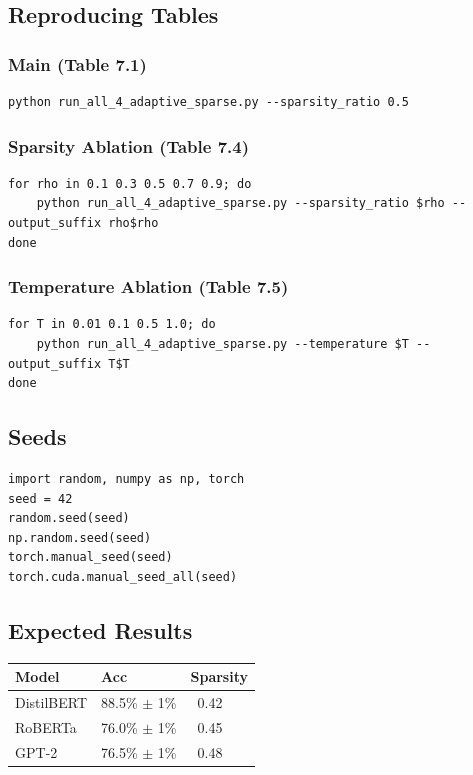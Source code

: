 \subsection{Reproducing Tables}

\subsubsection{Main (Table 7.1)}
\begin{lstlisting}
python run_all_4_adaptive_sparse.py --sparsity_ratio 0.5
\end{lstlisting}

\subsubsection{Sparsity Ablation (Table 7.4)}
\begin{lstlisting}
for rho in 0.1 0.3 0.5 0.7 0.9; do
    python run_all_4_adaptive_sparse.py --sparsity_ratio $rho --output_suffix rho$rho
done
\end{lstlisting}

\subsubsection{Temperature Ablation (Table 7.5)}
\begin{lstlisting}
for T in 0.01 0.1 0.5 1.0; do
    python run_all_4_adaptive_sparse.py --temperature $T --output_suffix T$T
done
\end{lstlisting}

\subsection{Seeds}

\begin{lstlisting}
import random, numpy as np, torch
seed = 42
random.seed(seed)
np.random.seed(seed)
torch.manual_seed(seed)
torch.cuda.manual_seed_all(seed)
\end{lstlisting}

\subsection{Expected Results}

\begin{table}[H]
\centering
\small
\begin{tabular}{lll}
\toprule
\textbf{Model} & \textbf{Acc} & \textbf{Sparsity} \\
\midrule
DistilBERT & 88.5\% $\pm$ 1\% & ~0.42 \\
RoBERTa & 76.0\% $\pm$ 1\% & ~0.45 \\
GPT-2 & 76.5\% $\pm$ 1\% & ~0.48 \\
\bottomrule
\end{tabular}
\end{table}

